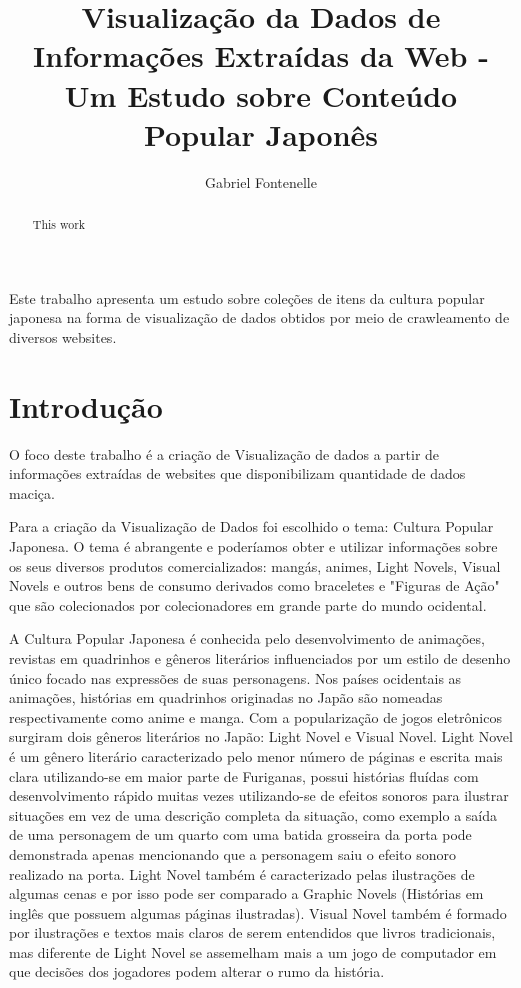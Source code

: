 \documentclass[12pt]{article}
\title{Visualização da Dados de Informações Extraídas da Web - Um Estudo sobre Conteúdo Popular Japonês}
\author{Gabriel Fontenelle\inst{1}}
\begin{document}
 
\maketitle

\begin{abstract}

This work 
\end{abstract}
     
\begin{resumo} 


Este trabalho apresenta um estudo sobre coleções de itens da cultura popular japonesa na forma de visualização de dados obtidos por meio de crawleamento de diversos websites.

\end{resumo}


\section{Introdução}

O foco deste trabalho é a criação de Visualização de dados a partir de informações extraídas de websites que disponibilizam quantidade de dados maciça.

Para a criação da Visualização de Dados foi escolhido o tema: Cultura Popular Japonesa. O tema é abrangente e poderíamos obter e utilizar informações sobre os seus diversos produtos comercializados: mangás, animes, Light Novels, Visual Novels e outros bens de consumo derivados como braceletes e "Figuras de Ação" que são colecionados por colecionadores em grande parte do mundo ocidental.

A Cultura Popular Japonesa é conhecida pelo desenvolvimento de animações, revistas em quadrinhos e gêneros literários influenciados por um estilo de desenho único focado nas expressões de suas personagens. Nos países ocidentais as animações, histórias em quadrinhos originadas no Japão são nomeadas respectivamente como anime e manga.
Com a popularização de jogos eletrônicos surgiram dois gêneros literários no Japão: Light Novel e Visual Novel. Light Novel é um gênero literário caracterizado pelo menor número de páginas e escrita mais clara utilizando-se em maior parte de Furiganas, possui histórias fluídas com desenvolvimento rápido muitas vezes utilizando-se de efeitos sonoros para ilustrar situações em vez de uma descrição completa da situação, como exemplo a saída de uma personagem de um quarto com uma batida grosseira da porta pode demonstrada apenas mencionando que a personagem saiu o efeito sonoro realizado na porta. Light Novel também é caracterizado pelas ilustrações de algumas cenas e por isso pode ser comparado a Graphic Novels (Histórias em inglês que possuem algumas páginas ilustradas). Visual Novel também é formado por ilustrações e textos mais claros de serem entendidos que livros tradicionais, mas diferente de Light Novel se assemelham mais a um jogo de computador em que decisões dos jogadores podem alterar o rumo da história.
\end{document}
